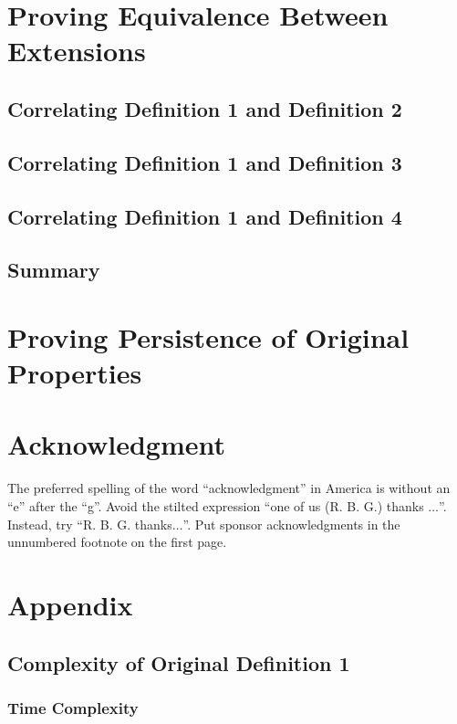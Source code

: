 \documentclass[conference]{IEEEtran}
\begin{document}
\section{Proving Equivalence Between Extensions}

\subsection{Correlating Definition 1 and Definition 2}

\subsection{Correlating Definition 1 and Definition 3}

\subsection{Correlating Definition 1 and Definition 4}

\subsection{Summary}

\section{Proving Persistence of Original Properties}

\section{Acknowledgment}

The preferred spelling of the word ``acknowledgment'' in America is without 
an ``e'' after the ``g''. Avoid the stilted expression ``one of us (R. B. 
G.) thanks $\ldots$''. Instead, try ``R. B. G. thanks$\ldots$''. Put sponsor 
acknowledgments in the unnumbered footnote on the first page.

\section{Appendix}

\subsection{Complexity of Original Definition 1}

\subsubsection{Time Complexity}
\end{document}

